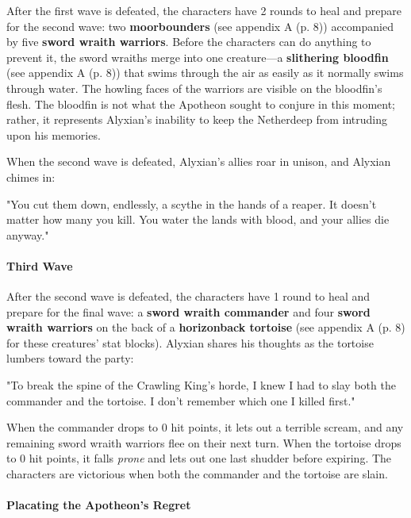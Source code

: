 \documentclass[letterpaper, 11pt, bg=full, twocolumn]{dndbook}
\begin{document}
After the first wave is defeated, the characters have 2 rounds to heal and prepare for the second wave: two \textbf{moorbounders} (see appendix A (p. 8)) accompanied by five \textbf{sword wraith warriors}. Before the characters can do anything to prevent it, the sword wraiths merge into one creature---a \textbf{slithering bloodfin} (see appendix A (p. 8)) that swims through the air as easily as it normally swims through water. The howling faces of the warriors are visible on the bloodfin's flesh. The bloodfin is not what the Apotheon sought to conjure in this moment; rather, it represents Alyxian's inability to keep the Netherdeep from intruding upon his memories.

When the second wave is defeated, Alyxian's allies roar in unison, and Alyxian chimes in:

\begin{DndReadAloud}
"You cut them down, endlessly, a scythe in the hands of a reaper. It doesn't matter how many you kill. You water the lands with blood, and your allies die anyway."
\end{DndReadAloud}

\paragraph{Third Wave}

After the second wave is defeated, the characters have 1 round to heal and prepare for the final wave: a \textbf{sword wraith commander} and four \textbf{sword wraith warriors} on the back of a \textbf{horizonback tortoise} (see appendix A (p. 8) for these creatures' stat blocks). Alyxian shares his thoughts as the tortoise lumbers toward the party:

\begin{DndReadAloud}
"To break the spine of the Crawling King's horde, I knew I had to slay both the commander and the tortoise. I don't remember which one I killed first."
\end{DndReadAloud}

When the commander drops to 0 hit points, it lets out a terrible scream, and any remaining sword wraith warriors flee on their next turn. When the tortoise drops to 0 hit points, it falls \textit{prone} and lets out one last shudder before expiring. The characters are victorious when both the commander and the tortoise are slain.

\paragraph{Placating the Apotheon's Regret}
\end{document}

